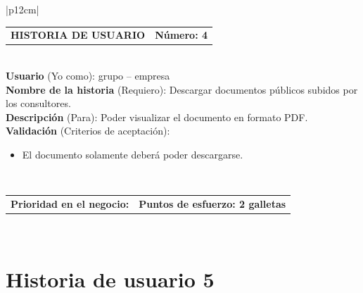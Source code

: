 \documentclass[11pt,letterpaper]{report}
\begin{document}
	\begin{center}	
		\begin{tabular}{|p{12cm}|}
			\hline
			\begin{tabular}{c|c}
				\textbf{HISTORIA DE USUARIO} & \textbf{Número: 4} \\
			\end{tabular} \\ \hline
			\textbf{Usuario} (Yo como): grupo – empresa \\ \hline
			\textbf{Nombre de la historia} (Requiero): Descargar documentos públicos subidos por los consultores. \\ \hline
			\textbf{Descripción} (Para): Poder visualizar el documento en formato PDF. \\ \hline
			\textbf{Validación} (Criterios de aceptación): \\
			\begin{minipage}{12cm}
				\begin{itemize}
					\item El documento solamente deberá poder descargarse.
				\end{itemize}
			\end{minipage} \\ \hline
			\begin{tabular}{p{6cm}|c}
				\textbf{Prioridad en el negocio: } & \textbf{Puntos de esfuerzo: 2 galletas} \\
			\end{tabular} \\ \hline
		\end{tabular}
	\end{center}
	
	\section{Historia de usuario 5}	
	
\end{document}
